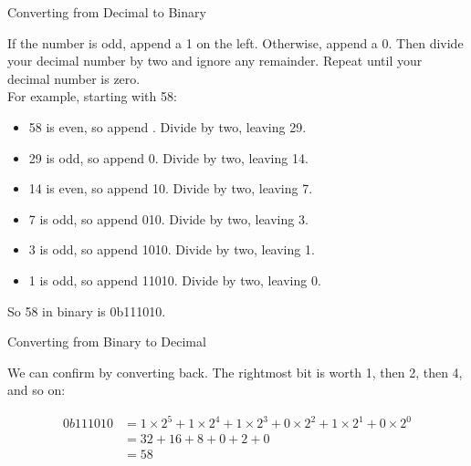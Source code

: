 \begin{frame}{Converting from Decimal to Binary}

    If the number is odd, append a 1 on the left. Otherwise, append a 0. Then
    divide your decimal number by two and ignore any remainder. Repeat until your
    decimal number is zero. \\

    For example, starting with 58:

    \begin{itemize}
        \item 58 is even, so append . Divide by two, leaving 29.
        \item 29 is odd, so append 0. Divide by two, leaving 14.
        \item 14 is even, so append 10. Divide by two, leaving 7.
        \item 7 is odd, so append 010. Divide by two, leaving 3.
        \item 3 is odd, so append 1010. Divide by two, leaving 1.
        \item 1 is odd, so append 11010. Divide by two, leaving 0.
    \end{itemize}

    So 58 in binary is 0b111010.

\end{frame}

\begin{frame}{Converting from Binary to Decimal}

    We can confirm by converting back. The rightmost bit is worth 1, then 2, then
    4, and so on:

    \begin{align*}
        0b111010 & =
        1 \! \times \! 2^5 +
        1 \! \times \! 2^4 +
        1 \! \times \! 2^3 +
        0 \! \times \! 2^2 +
        1 \! \times \! 2^1 +
        0 \! \times \! 2^0                    \\
                 & = 32 + 16  + 8 + 0 + 2 + 0 \\
                 & = 58
    \end{align*}

\end{frame}

